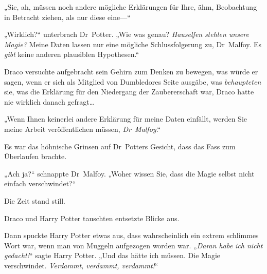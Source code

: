 „Sie, ah, müssen noch andere mögliche Erklärungen für Ihre, ähm, Beobachtung in Betracht ziehen, als nur diese eine—“

„Wirklich?“ unterbrach Dr~Potter. „Wie was genau? \emph{Hauselfen} \emph{stehlen unsere Magie?} Meine Daten lassen nur eine mögliche Schlussfolgerung zu, Dr~Malfoy. Es \emph{gibt} keine anderen plausiblen Hypothesen.“

Draco versuchte aufgebracht sein Gehirn zum Denken zu bewegen, was würde er sagen, wenn er sich als Mitglied von Dumbledores Seite ausgäbe, was \emph{behaupteten} sie, was die Erklärung für den Niedergang der Zaubererschaft war, Draco hatte nie wirklich danach gefragt…

„Wenn Ihnen keinerlei andere Erklärung für meine Daten einfällt, werden Sie meine Arbeit veröffentlichen müssen, \emph{Dr~Malfoy}.“

Es war das höhnische Grinsen auf Dr~Potters Gesicht, dass das Fass zum Überlaufen brachte.

„Ach ja?“ schnappte Dr~Malfoy. „Woher wissen Sie, dass die Magie selbst nicht einfach verschwindet?“

Die Zeit stand still.

Draco und Harry Potter tauschten entsetzte Blicke aus.

Dann spuckte Harry Potter etwas aus, dass wahrscheinlich ein extrem schlimmes Wort war, wenn man von Muggeln aufgezogen worden war. „\emph{Daran habe ich nicht gedacht!}“ sagte Harry Potter. „Und das hätte ich müssen. Die Magie verschwindet. \emph{Verdammt, verdammt, verdammt!}“

